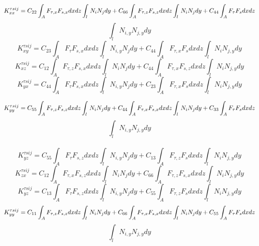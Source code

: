 \documentclass[a4paper,12pt]{article}
\begin{document}
$$K_{xx}^{\tau s i j} = C_{22} \int_{A}^{} F_{\tau,x} F_{s,x} dx dz \int_{l}^{} N_{i} N_{j} dy + C_{66} \int_{A}^{} F_{\tau,z} F_{s,z} dx dz \int_{l}^{} N_{i} N_{j} dy + C_{44} \int_{A}^{} F_{\tau} F_{s} dx dz\\$$ $$\int_{l}^{} N_{i,y} N_{j,y} dy $$
$$ K_{xy}^{\tau s i j} = C_{23} \int_{A}^{} F_{\tau} F_{s,x} dx dz \int_{l}^{} N_{i,y} N_{j} dy + C_{44} \int_{A}^{} F_{\tau,x} F_{s} dx dz \int_{l}^{} N_{i} N_{j,y} dy$$
$$ K_{xz}^{\tau s i j} = C_{12} \int_{A}^{} F_{\tau,z} F_{s,x} dx dz \int_{l}^{} N_{i} N_{j} dy + C_{44} \int_{A}^{} F_{\tau,x} F_{s,z} dx dz \int_{l}^{} N_{i} N_{j,y} dy$$
$$ K_{yx}^{\tau s i j} = C_{44} \int_{A}^{} F_{\tau} F_{s,x} dx dz \int_{l}^{} N_{i,y} N_{j} dy + C_{23} \int_{A}^{} F_{\tau,x} F_{s} dx dz \int_{l}^{} N_{i} N_{j,y} dy$$


$$ K_{yy}^{\tau s i j} = C_{55} \int_{A}^{} F_{\tau,z} F_{s,z} dx dz \int_{l}^{} N_{i} N_{j} dy + C_{44} \int_{A}^{} F_{\tau,x} F_{s,x} dx dz \int_{l}^{} N_{i} N_{j} dy + C_{33} \int_{A}^{} F_{\tau} F_{s} dx dz\\$$ $$\int_{l}^{} N_{i,y} N_{j,y} dy $$\\
$$ K_{yz}^{\tau s i j} = C_{55} \int_{A}^{} F_{\tau} F_{s,z} dx dz \int_{l}^{} N_{i,y} N_{j} dy + C_{13} \int_{A}^{} F_{\tau,z} F_{s} dx dz \int_{l}^{} N_{i} N_{j,y} dy$$
$$ K_{zx}^{\tau s i j} = C_{12} \int_{A}^{} F_{\tau,x} F_{s,z} dx dz \int_{l}^{} N_{i} N_{j} dy + C_{66} \int_{A}^{} F_{\tau,z} F_{s,x} dx dz \int_{l}^{} N_{i} N_{j,y} dy$$
$$ K_{yz}^{\tau s i j} = C_{13} \int_{A}^{} F_{\tau} F_{s,z} dx dz \int_{l}^{} N_{i,y} N_{j} dy + C_{55} \int_{A}^{} F_{\tau,z} F_{s} dx dz \int_{l}^{} N_{i} N_{j,y} dy$$
$$ K_{yy}^{\tau s i j} = C_{11} \int_{A}^{} F_{\tau,z} F_{s,z} dx dz \int_{l}^{} N_{i} N_{j} dy + C_{66} \int_{A}^{} F_{\tau,x} F_{s,x} dx dz \int_{l}^{} N_{i} N_{j} dy + C_{55} \int_{A}^{} F_{\tau} F_{s} dx dz\\$$ $$\int_{l}^{} N_{i,y} N_{j,y} dy $$
\end{document}
